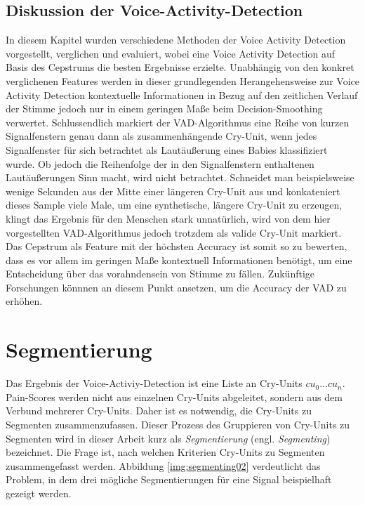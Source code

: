 \subsection{Diskussion der Voice-Activity-Detection}

In diesem Kapitel wurden verschiedene Methoden der Voice Activity Detection vorgestellt, verglichen und evaluiert, wobei eine Voice Activity Detection auf Basis des Cepstrums die besten Ergebnisse erzielte. Unabhängig von den konkret verglichenen Features werden in dieser grundlegenden Herangehensweise zur Voice Activity Detection kontextuelle Informationen in Bezug auf den zeitlichen Verlauf der Stimme jedoch nur in einem geringen Maße beim Decision-Smoothing verwertet. Schlussendlich markiert der VAD-Algorithmus eine Reihe von kurzen Signalfenstern genau dann als zusammenhängende Cry-Unit, wenn jedes Signalfenster für sich betrachtet als Lautäußerung eines Babies klassifiziert wurde. Ob jedoch die Reihenfolge der in den Signalfenstern enthaltenen Lautäußerungen Sinn macht, wird nicht betrachtet. Schneidet man beispielsweise wenige Sekunden aus der Mitte einer längeren Cry-Unit aus und konkateniert dieses Sample viele Male, um eine synthetische, längere Cry-Unit zu erzeugen, klingt das Ergebnis für den Menschen stark unnatürlich, wird von dem hier vorgestellten VAD-Algorithmus jedoch trotzdem als valide Cry-Unit markiert. Das Cepstrum als Feature mit der höchsten Accuracy ist somit so zu bewerten, dass es vor allem im geringen Maße kontextuell Informationen benötigt, um eine Entscheidung über das vorahndensein von Stimme zu fällen. Zukünftige Forschungen könnnen an diesem Punkt ansetzen, um die Accuracy der VAD zu erhöhen.

\section{Segmentierung}
\label{sec:segmenting}
Das Ergebnis der Voice-Activiy-Detection ist eine Liste an Cry-Units  $cu_0 \ldots cu_n$. Pain-Scores werden nicht aus einzelnen Cry-Units abgeleitet, sondern aus dem Verbund mehrerer Cry-Units. Daher ist es notwendig, die Cry-Units zu Segmenten zusammenzufassen. Dieser Prozess des Gruppieren von Cry-Units zu Segmenten wird in dieser Arbeit kurz als \emph{Segmentierung} (engl. \emph{Segmenting}) bezeichnet. Die Frage ist, nach welchen Kriterien Cry-Units zu Segmenten zusammengefasst werden. Abbildung \ref{img:segmenting02} verdeutlicht das Problem, in dem drei mögliche Segmentierungen für eine Signal beispielhaft gezeigt werden.

